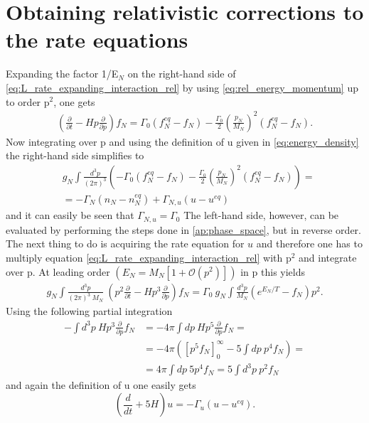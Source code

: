 \section{Obtaining relativistic corrections to the rate equations}
\label{ap:rel_corrections}
Expanding the factor 1/E$_N$ on the right-hand side of \eqref{eq:L_rate_expanding_interaction_rel} by using \eqref{eq:rel_energy_momentum} up to order p$^2$, one gets
\begin{align*}
		\left(\frac{\partial}{\partial t}-Hp\frac{\partial}{\partial p}\right)f_N=\Gamma_0\left(f_N^{eq}-f_N\right)-\frac{\Gamma_0}{2}\left(\frac{p_N}{M_N}\right)^2\left(f_N^{eq}-f_N\right).
\end{align*}
Now integrating over p and using the definition of u given in \eqref{eq:energy_density} the right-hand side simplifies to
\begin{align*}
	&g_N\int \frac{d^3p}{(2\pi)^3}\left(-\Gamma_0\left(f_N^{eq}-f_N\right)-\frac{\Gamma_0}{2}\left(\frac{p_N}{M_N}\right)^2\left(f_N^{eq}-f_N\right)\right)=\\&=-\Gamma_N\left(n_N-n_N^{eq}\right)+\Gamma_{N,u}\left(u-u^{eq}\right)
\end{align*}
and it can easily be seen that $\Gamma_{N,u}=\Gamma_{0}$ \newline\indent
The left-hand side, however, can be evaluated by performing the steps done in \ref{ap:phase_space}, but in reverse order. \newline\indent
The next thing to do is acquiring the rate equation for $u$ and therefore one has to multiply equation \eqref{eq:L_rate_expanding_interaction_rel} with p$^2$ and integrate over p. At leading order $\left(E_N=M_N\left[1+\mathcal{O}(p^2)\right]\right)$ in p this yields
\begin{align*}
	g_N\int \frac{d^3p}{(2\pi)^3\:M_N}\:\left(p^2\frac{\partial}{\partial t}-Hp^3\frac{\partial}{\partial p}\right)f_N=\Gamma_0\:g_N\int \frac{d^3p}{M_N}\left(e^{E_N/T}-f_N\right)p^2.
\end{align*}
Using the following partial integration
\begin{align*}
	-\int d^3p\:Hp^3\frac{\partial}{\partial p}f_N&=-4\pi\int dp\:Hp^5\frac{\partial}{\partial p}f_N=\\
	&=-4\pi\left(\left[p^5f_N\right]_0^\infty-5\int dp\: p^4f_N\right)=\\
	&=4\pi\int dp\: 5p^4f_N=5\int d^3p\: p^2f_N
\end{align*}
and again the definition of u one easily gets
\begin{equation*}
	\left(\frac{d}{dt}+5H\right)u=-\Gamma_u\left(u-u^{eq}\right).
\end{equation*}
